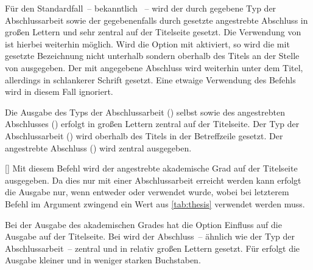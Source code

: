 \begin{Declaration*}{}
\begin{Declaration*}{}
\begin{Declaration*}{}
\begin{Declaration}{}
Für den Standardfall~-- bekanntlich ~-- wird der 
durch  gegebene Typ der Abschlussarbeit sowie der gegebenenfalls 
durch  gesetzte angestrebte Abschluss in großen Lettern und 
sehr zentral auf der Titelseite gesetzt. Die Verwendung von  ist 
hierbei weiterhin möglich.
%
Wird die Option mit  aktiviert, so wird die mit 
 gesetzte Bezeichnung nicht unterhalb sondern oberhalb des Titels 
an der Stelle von  ausgegeben. Der mit  
angegebene Abschluss wird weiterhin unter dem Titel, allerdings in schlankerer 
Schrift gesetzt. Eine etwaige Verwendung des Befehls  wird in 
diesem Fall ignoriert.
%
\begin{values}{}
\itemfalse
  Die Ausgabe des Typs der Abschlussarbeit () selbst sowie des 
  angestrebten Abschlusses () erfolgt in großen Lettern 
  zentral auf der Titelseite.
\itemtrue*
  Der Typ der Abschlussarbeit () wird oberhalb des Titels in der 
  Betreffzeile gesetzt. Der angestrebte Abschluss () wird 
  zentral ausgegeben.
\end{values}
\end{Declaration}

\begin{Declaration}[v2.02]{%
  []%
}
\printdeclarationlist%
%
Mit diesem Befehl wird der angestrebte akademische Grad auf der Titelseite 
ausgegeben. Da dies nur mit einer Abschlussarbeit erreicht werden kann erfolgt 
die Ausgabe nur, wenn entweder  oder  verwendet 
wurde, wobei bei letzterem Befehl im Argument zwingend ein Wert aus 
\autoref{tab:thesis} verwendet werden muss.

Bei der Ausgabe des akademischen Grades hat die Option  
Einfluss auf die Ausgabe auf der Titelseite. Bei  
wird der Abschluss~-- ähnlich wie der Typ der Abschlussarbeit~-- zentral und in 
relativ großen Lettern gesetzt. Für  erfolgt die 
Ausgabe kleiner und in weniger starken Buchstaben.
\end{Declaration}


\end{Declaration*}
\end{Declaration*}
\end{Declaration*}
